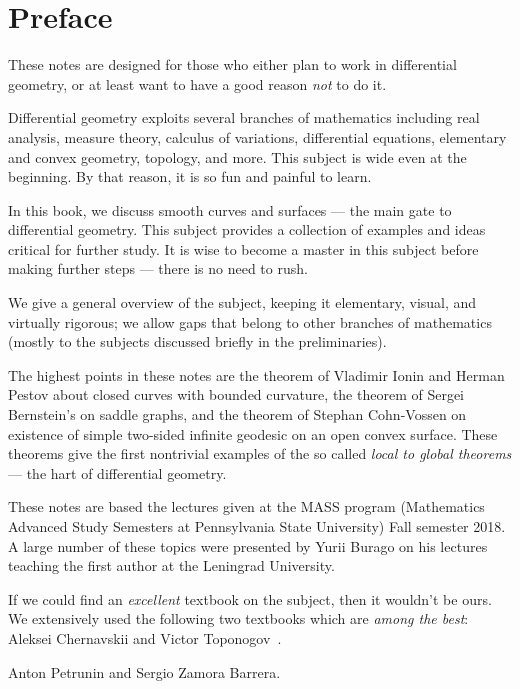 
\chapter*{Preface}

These notes are designed for those who either plan to work in differential geometry,
or at least want to have a good reason \emph{not} to do it.

Differential geometry exploits several branches of mathematics including 
real analysis, 
measure theory,
calculus of variations,
differential equations,
elementary and convex geometry,
topology, and more.
This subject is wide even at the beginning. 
By that reason, it is so fun and painful to learn.

In this book, we discuss smooth curves and surfaces --- the main gate to differential geometry.
This subject provides a collection of examples and ideas critical for further study.
It is wise to become a master in this subject before making further steps --- there is no need to rush.

We give a general overview of the subject, keeping it elementary, visual, and virtually rigorous; we allow gaps that belong to other branches of mathematics (mostly to the subjects discussed briefly in the preliminaries).

The highest points in these notes are
the theorem of Vladimir Ionin and Herman Pestov about closed curves with bounded curvature,
the theorem of Sergei Bernstein's on saddle graphs,
and the theorem of Stephan Cohn-Vossen on existence of simple two-sided infinite geodesic on an open convex surface.
These theorems give the first nontrivial examples of the so called {}\emph{local to global theorems} --- the hart of differential geometry.

These notes are based the lectures given at the MASS program (Mathematics Advanced Study Semesters at Pennsylvania State University) Fall semester 2018.
A large number of these topics were presented by Yurii Burago on his lectures teaching the first author at the Leningrad University.

If we could find an \emph{excellent} textbook on the subject, then it wouldn't be ours.
We extensively used the following two textbooks which are \emph{among the best}: Aleksei Chernavskii \cite{chernavsky} and Victor Toponogov~\cite{toponogov-book}.

\begin{flushright}
Anton Petrunin and
Sergio Zamora Barrera.
\end{flushright}



\newpage
\tableofcontents
